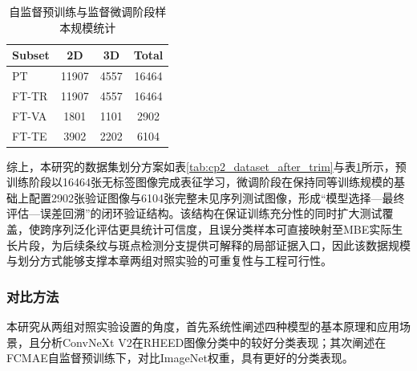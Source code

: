 \begin{table}[htbp]
    \centering
    \caption{自监督预训练与监督微调阶段样本规模统计}
    \label{tab:cp2_split_stats}
    \begin{tabular}{lccc}
        \hline
        Subset & 2D    & 3D   & Total \\ \hline
        PT     & 11907 & 4557 & 16464 \\
        FT-TR  & 11907 & 4557 & 16464 \\
        FT-VA  & 1801  & 1101 & 2902  \\
        FT-TE  & 3902  & 2202 & 6104  \\ \hline
    \end{tabular}
\end{table}

综上，本研究的数据集划分方案如表\ref{tab:cp2_dataset_after_trim}与表\ref{tab:cp2_split_stats}所示，预训练阶段以16464张无标签图像完成表征学习，微调阶段在保持同等训练规模的基础上配置2902张验证图像与6104张完整未见序列测试图像，形成“模型选择—最终评估—误差回溯”的闭环验证结构。该结构在保证训练充分性的同时扩大测试覆盖，使跨序列泛化评估更具统计可信度，且误分类样本可直接映射至MBE实际生长片段，为后续条纹与斑点检测分支提供可解释的局部证据入口，因此该数据规模与划分方式能够支撑本章两组对照实验的可重复性与工程可行性。

\subsubsection{对比方法}

本研究从两组对照实验设置的角度，首先系统性阐述四种模型的基本原理和应用场景，且分析ConvNeXt V2在RHEED图像分类中的较好分类表现；其次阐述在FCMAE自监督预训练下，对比ImageNet权重，具有更好的分类表现。

